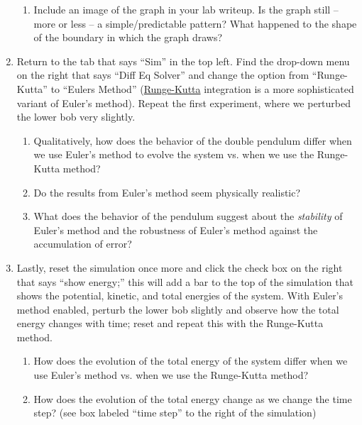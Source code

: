 \documentclass[11pt]{article}
\begin{document}
\begin{enumerate}[resume]
\begin{enumerate}
    \item Include an image of the graph in your lab writeup. Is the graph still -- more or less -- a simple/predictable pattern? What happened to the shape of the boundary in which the graph draws?
\end{enumerate}

\item Return to the tab that says ``Sim'' in the top left. Find the drop-down menu on the right that says ``Diff Eq Solver'' and change the option from ``Runge-Kutta'' to ``Eulers Method'' (\href{https://en.wikipedia.org/wiki/Runge\%E2\%80\%93Kutta_methods}{Runge-Kutta} integration is a more sophisticated variant of Euler's method). Repeat the first experiment, where we perturbed the lower bob very slightly. 
\begin{enumerate}
    \item Qualitatively, how does the behavior of the double pendulum differ when we use Euler's method to evolve the system vs. when we use the Runge-Kutta method?
    
    \item Do the results from Euler's method seem physically realistic?
    
    \item What does the behavior of the pendulum suggest about the \emph{stability} of Euler's method and the robustness of Euler's method against the accumulation of error?
\end{enumerate}  

\item Lastly, reset the simulation once more and click the check box on the right that says ``show energy;'' this will add a bar to the top of the simulation that shows the potential, kinetic, and total energies of the system. With Euler's method enabled, perturb the lower bob slightly and observe how the total energy changes with time; reset and repeat this with the Runge-Kutta method. 
\begin{enumerate}
    \item How does the evolution of the total energy of the system differ when we use Euler's method vs. when we use the Runge-Kutta method?
    
    \item How does the evolution of the total energy change as we change the time step? (see box labeled ``time step'' to the right of the simulation)
\end{enumerate} 

\end{enumerate}
\end{document}
